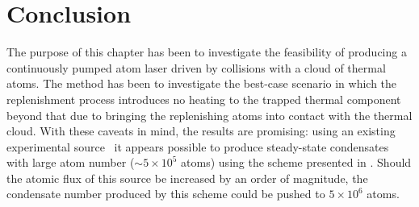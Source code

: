 




\section{Conclusion}

The purpose of this chapter has been to investigate the feasibility of producing a continuously pumped atom laser driven by  collisions with a cloud of thermal atoms.  The method has been to investigate the best-case scenario in which the replenishment process introduces no heating to the trapped thermal component beyond that due to bringing the replenishing atoms into contact with the thermal cloud.  With these caveats in mind, the results are promising: using an existing experimental source~\citep{Muller:2007} it appears possible to produce steady-state condensates with large atom number ($\sim 5\times 10^5$ atoms) using the scheme presented in .  Should the atomic flux of this source be increased by an order of magnitude, the condensate number produced by this scheme could be pushed to $5\times 10^6$ atoms.  

